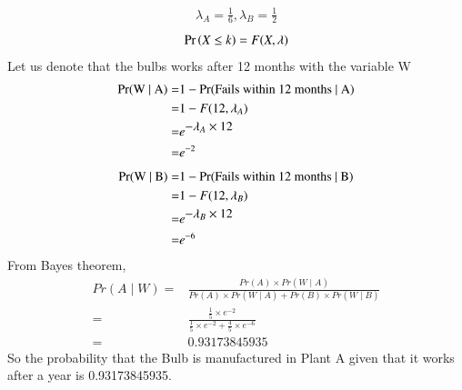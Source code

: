 \documentclass[journal,12pt,twocolumn]{IEEEtran}
\begin{document}
\begin{align}
    \lambda_A = \frac{1}{6} , \lambda_B = \frac{1}{2}
\end{align}
\begin{align}
    \Pr\left(X\leq k\right) = F(X,\lambda)
\end{align}
Let us denote that the bulbs works after 12 months with the variable W
\begin{align}
\text{Pr(W $\mid$ A)} = & 1 -\notag \text{Pr(Fails within 12 months $\mid$ A)}\\
    = & 1 - F(12,\lambda_A)                       \\
    = & {e}^{\displaystyle - \lambda_A \times 12} \\
    = & {e}^{-2}
\end{align}
\begin{align}
    \text{Pr(W $\mid$ B)} = & 1 -\notag \text{Pr(Fails within 12 months $\mid$ B)}\\
        = & 1 - F(12,\lambda_B)                       \\
        = & {e}^{\displaystyle - \lambda_B \times 12} \\
        = & {e}^{-6}
\end{align}
From Bayes theorem,\\
\begin{align}
    Pr(A \mid W) = & \displaystyle{\frac{Pr(A) \times Pr(W \mid A)}{Pr(A) \times Pr(W \mid A) + Pr(B) \times Pr(W \mid B)}}                                                     \\
    =              & \displaystyle{\frac{ \displaystyle{\frac{1}{5}} \times {e}^{-2}}{\displaystyle{\frac{1}{5}} \times {e}^{-2} + \displaystyle{\frac{4}{5}} \times {e}^{-6}}} \\[0.5cm]
    =              & 0.93173845935
\end{align}
So the probability that the Bulb is manufactured in Plant A given that it works after a year is 0.93173845935.
\pagebreak
\end{document}
